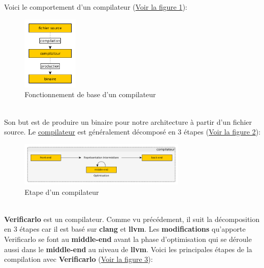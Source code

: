 \documentclass[11pt]{article}
\begin{document}
Voici le comportement d'un compilateur
(\hyperref[fig:orge695f88]{Voir la figure 1}):
\vspace{5mm}
\begin{figure}[htbp]
\centering
\includegraphics[width=100px]{../ressources/compilation.png}
\caption{\label{fig:orge695f88}Fonctionnement de base d'un compilateur}
\end{figure}\\
\vspace{5mm}
Son but est de produire un binaire pour notre architecture à partir
d'un fichier source.
\vspace{5mm}
Le \href{https://sifflez.org/lectures/compil/week1/3-compiler-anatomy.pdf}{compilateur} est généralement décomposé en 3 étapes
(\hyperref[fig:org97c1cff]{Voir la figure 2}):
\vspace{5mm}
\begin{figure}[htbp]
\centering
\includegraphics[width=300px]{../ressources/compiler_step.png}
\caption{\label{fig:org97c1cff}Etape d'un compilateur}
\end{figure}\\
\vspace{5mm}
\textbf{Verificarlo} est un compilateur. Comme vu précédement, il suit la
décomposition en 3 étapes car il est basé sur \textbf{clang} et
\textbf{llvm}. Les \textbf{modifications} qu'apporte Verificarlo se font au
\textbf{middle-end} avant la phase d'optimisation qui se déroule aussi
dans le \textbf{middle-end} au niveau de \textbf{llvm}.
\vspace{5mm}
Voici les principales étapes de la compilation avec \textbf{Verificarlo}
(\hyperref[fig:orgfd31292]{Voir la figure 3}):
\vspace{5mm}
\end{document}
